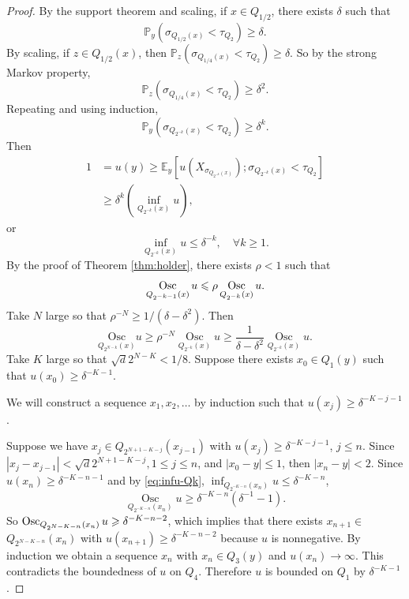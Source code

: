 \documentclass[twoside, 12pt]{book}
\numberwithin{equation}{chapter}
\def\geq{\geqslant}
\def\leq{\leqslant}
\def\osc{\mathop{{\rm Osc}}}
\begin{document}
\begin{proof}
        By the support theorem and scaling, if $x \in Q_{1/2}$, there exists $\delta$ such that 
        \[
            \mathbb{P}_y\left(\sigma_{Q_{1/2}(x)}<\tau_{Q_2}\right) \geq \delta .
        \]
        By scaling, if $z \in Q_{1/2}(x)$, then $\mathbb{P}_z\left(\sigma_{Q_{1/4}(x)}<\tau_{Q_2}\right) \geq \delta$. So by the strong Markov property,
        \[
            \mathbb{P}_z\left(\sigma_{Q_{1/4}(x)}<\tau_{Q_2}\right) \geq \delta^2 .
        \]
        Repeating and using induction,
        \[
            \mathbb{P}_y\left(\sigma_{Q_{2^{-k}}(x)}<\tau_{Q_2}\right) \geq \delta^k .
        \]
        Then
        \[
            \begin{aligned}
                1 & =u(y) \geq \mathbb{E}_y\left[u\left(X_{\sigma_{Q_{2^{-k}}(x)}}\right) ; \sigma_{Q_{2^{-k}}(x)}<\tau_{Q_2}\right] \\
                & \geq \delta^k\left(\inf _{Q_{2^{-k}}(x)} u\right),
            \end{aligned}
        \]
        or 
        \begin{equation}\label{eq:infu-Qk}
            \inf _{Q_{2^{-k}}(x)} u \leq \delta^{-k} , \quad \forall k\geq 1. 
        \end{equation}
        By the proof of Theorem \ref{thm:holder}, there exists $\rho<1$ such that
        \[
             \osc_{Q_{2^{-k-1}}(x)} u\leq \rho \osc_{Q_{2^{-k}}(x)}u .
        \]
        Take $N$ large so that $\rho^{-N} \geq 1/\left(\delta-\delta^2\right)$.  Then
        \[
            \underset{Q_{2^{N-k}}(x)}{\mathrm{Osc}} u \geq \rho^{-N} \underset{Q_{2^{-k}}(x)}{\operatorname{Osc}} u \geq \frac{1}{\delta-\delta^2} \underset{Q_{2^{-k}}(x)}{\operatorname{Osc}} u .
        \]
        Take $K$ large so that $\sqrt{d} 2^{N-K}<1 / 8$. Suppose there exists $x_0 \in Q_1(y)$ such that $u\left(x_0\right) \geq \delta^{-K-1}$. 
        \begin{framed}
            We will construct a sequence $x_1, x_2, \ldots$ by induction such that $u(x_j)\geq \delta^{-K-j-1}$. 
        \end{framed} Suppose we have $x_j \in Q_{2^{N+1-K-j}}\left(x_{j-1}\right)$ with $u\left(x_j\right) \geq \delta^{-K-j-1}$, $j \leq n$. Since $\left|x_j-x_{j-1}\right|<\sqrt{d} 2^{N+1-K-j}, 1 \leq j \leq n$, and $\left|x_0-y\right| \leq 1$, then $\left|x_n-y\right|<2$. Since $u\left(x_n\right) \geq \delta^{-K-n-1}$ and by  \eqref{eq:infu-Qk}, $\inf _{Q_{2^{-K-n}}(x_n)} u \leq \delta^{-K-n}$, 
        $$
            \underset{Q_{2^{-K-n}}(x_n)}{\operatorname{Osc}} u \geq \delta^{-K-n}\left(\delta^{-1}-1\right) .
        $$
        So $\osc_{Q_{2^{N-K-n}}(x_n)} u \geq \delta^{-K-n-2}$, which implies that there exists $x_{n+1} \in$ $Q_{ 2^{N-K-n}}(x_n)$ with $u\left(x_{n+1}\right) \geq \delta^{-K-n-2}$ because $u$ is nonnegative. By induction we obtain a sequence $x_n$ with $x_n \in Q_3(y)$ and $u\left(x_n\right) \rightarrow \infty$. This contradicts the boundedness of $u$ on $Q_4$. Therefore $u$ is bounded on $Q_1$ by $\delta^{-K-1}$.
    \end{proof}
	
\end{document}
